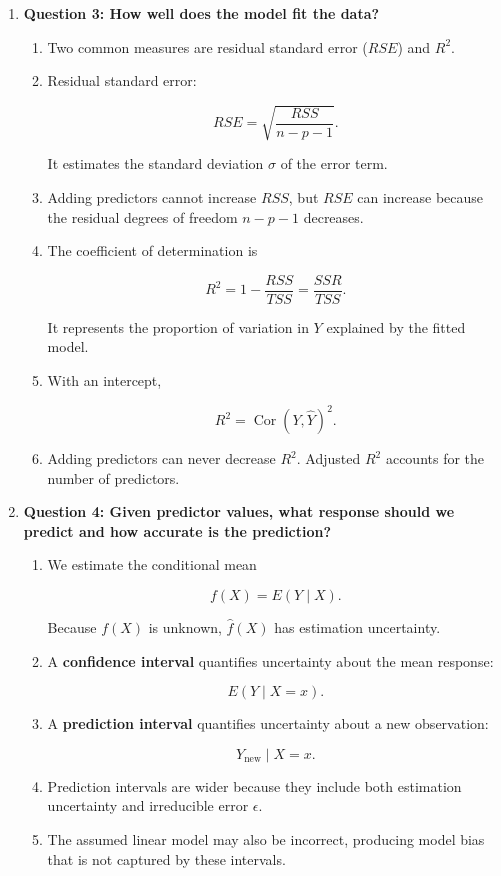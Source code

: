 \documentclass{article}
\begin{document}
\begin{enumerate}
\item \textbf{Question 3: How well does the model fit the data?}
\begin{enumerate}
\item Two common measures are residual standard error ($RSE$) and $R^2$.

\item Residual standard error:

$$
RSE=
\sqrt{\frac{RSS}{n-p-1}}.
$$

It estimates the standard deviation $\sigma$ of the error term.

\item Adding predictors cannot increase $RSS$, but $RSE$ can increase because the residual degrees of freedom $n-p-1$ decreases.

\item The coefficient of determination is

$$
R^2
=
1-\frac{RSS}{TSS}
=
\frac{SSR}{TSS}.
$$

It represents the proportion of variation in $Y$ explained by the fitted model.

\item With an intercept,

$$
R^2=\operatorname{Cor}(Y,\hat Y)^2.
$$

\item Adding predictors can never decrease $R^2$. Adjusted $R^2$ accounts for the number of predictors.
\end{enumerate}

\item \textbf{Question 4: Given predictor values, what response should we predict and how accurate is the prediction?}
\begin{enumerate}
\item We estimate the conditional mean

$$
f(X)=E(Y\mid X).
$$

Because $f(X)$ is unknown, $\hat f(X)$ has estimation uncertainty.

\item A \textbf{confidence interval} quantifies uncertainty about the mean response:

$$
E(Y\mid X=x).
$$

\item A \textbf{prediction interval} quantifies uncertainty about a new observation:

$$
Y_{\text{new}}\mid X=x.
$$

\item Prediction intervals are wider because they include both estimation uncertainty and irreducible error $\epsilon$.

\item The assumed linear model may also be incorrect, producing model bias that is not captured by these intervals.
\end{enumerate}

\end{enumerate}
\end{document}

